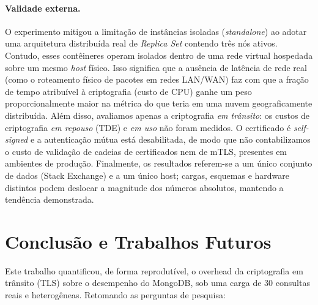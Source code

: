 \documentclass[12pt]{article}
\begin{document}
\paragraph{Validade externa.} O experimento mitigou a limitação de instâncias isoladas (\emph{standalone}) ao adotar uma arquitetura distribuída real de \emph{Replica Set} contendo três nós ativos. Contudo, esses contêineres operam isolados dentro de uma rede virtual hospedada sobre um mesmo \emph{host} físico. Isso significa que a ausência de latência de rede real (como o roteamento físico de pacotes em redes LAN/WAN) faz com que a fração de tempo atribuível à criptografia (custo de CPU) ganhe um peso proporcionalmente maior na métrica do que teria em uma nuvem geograficamente distribuída. Além disso, avaliamos apenas a criptografia \emph{em trânsito}: os custos de criptografia \emph{em repouso} (TDE) e \emph{em uso} não foram medidos. O certificado é \emph{self-signed} e a autenticação mútua está desabilitada, de modo que não contabilizamos o custo de validação de cadeias de certificados nem de mTLS, presentes em ambientes de produção. Finalmente, os resultados referem-se a um único conjunto de dados (Stack Exchange) e a um único host; cargas, esquemas e hardware distintos podem deslocar a magnitude dos números absolutos, mantendo a tendência demonstrada.


\section{Conclusão e Trabalhos Futuros}
\label{sec:conclusao}

Este trabalho quantificou, de forma reprodutível, o overhead da criptografia em
trânsito (TLS) sobre o desempenho do MongoDB, sob uma carga de 30 consultas reais
e heterogêneas. Retomando as perguntas de pesquisa:
\end{document}
